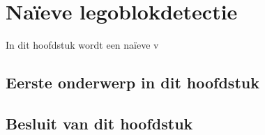 \chapter{Na\"ieve legoblokdetectie}
\label{hoofdstuk:2}
In dit hoofdstuk wordt een na\"ieve v

\section{Eerste onderwerp in dit hoofdstuk}

\section{Besluit van dit hoofdstuk}
